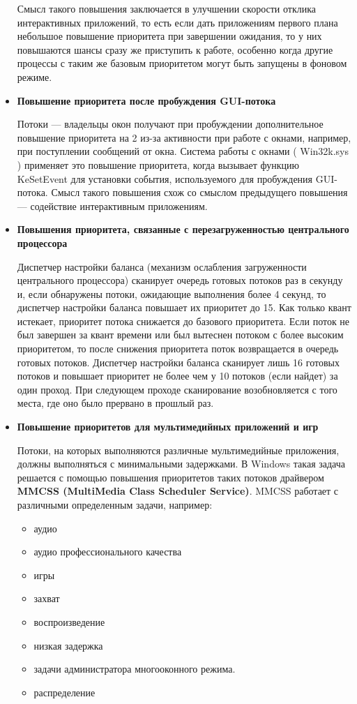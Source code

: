 \begin{itemize}
	Смысл такого повышения заключается в улучшении скорости отклика интерактивных приложений, то есть если дать приложениям первого плана небольшое повышение	приоритета при завершении ожидания, то у них повышаются шансы сразу же приступить к работе, особенно когда другие процессы с таким же базовым приоритетом	могут быть запущены в фоновом режиме.
	
	\item \textbf{Повышение приоритета после пробуждения GUI-потока}
	
	Потоки — владельцы окон получают при пробуждении дополнительное повышение приоритета на 2 из-за активности при работе с окнами, например, при поступлении сообщений от окна. Система работы с окнами ( Win32k.sys ) применяет это повышение приоритета, когда вызывает функцию KeSetEvent для установки события, используемого для пробуждения GUI-потока. Смысл такого повышения схож со смыслом 		предыдущего повышения — содействие интерактивным приложениям.
	
	\item \textbf{Повышения приоритета, связанные с перезагруженностью центрального процессора}
	
	Диспетчер настройки баланса (механизм ослабления загруженности центрального процессора) сканирует очередь готовых потоков раз в секунду и, если обнаружены потоки, ожидающие выполнения более 4 секунд, то диспетчер настройки баланса повышает их приоритет до 15. Как только квант истекает, приоритет потока снижается до базового приоритета. Если поток не был завершен за квант времени или был вытеснен потоком с более высоким приоритетом, то после снижения 		приоритета поток возвращается в очередь готовых потоков. Диспетчер настройки баланса сканирует лишь 16 готовых потоков и повышает приоритет не более чем у 10 потоков (если найдет) за один проход. При следующем проходе сканирование возобновляется	с того места, где оно было прервано в прошлый раз. 
	
	
	\item \textbf{Повышение приоритетов для мультимедийных приложений и игр}
	
		Потоки, на которых выполняются различные мультимедийные приложения, должны выполняться с минимальными задержками. В Windows такая задача решается с помощью повышения приоритетов таких потоков драйвером \textbf{MMCSS (MultiMedia Class Scheduler Service)}. MMCSS работает с различными определенным задачи, например:
		\begin{itemize}
			\item аудио
			\item аудио профессионального качества
			\item игры
			\item захват
			\item воспроизведение
			\item низкая задержка
			\item задачи администратора многооконного режима.
			\item распределение
		\end{itemize}
\end{itemize}

